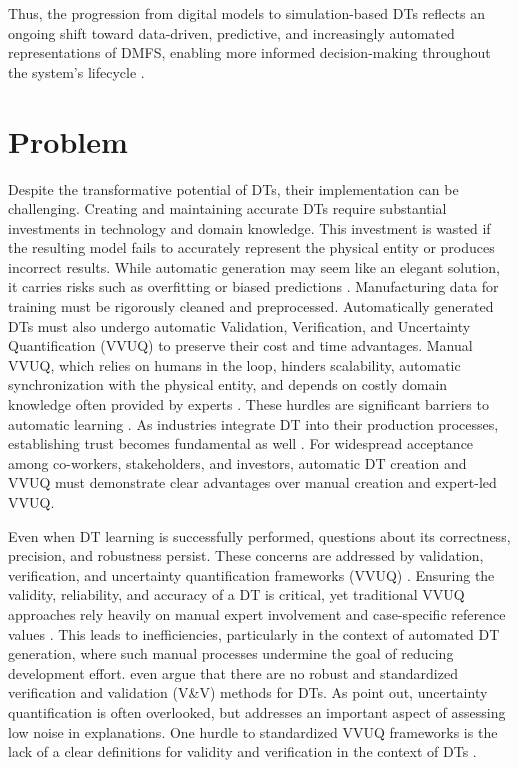 Thus, the progression from digital models to simulation-based DTs reflects an ongoing shift toward data-driven, predictive, and increasingly automated representations of DMFS, enabling more informed decision-making throughout the system's lifecycle \autocite{boschert2016digital,lim2020state}.

\section{Problem}
\label{sec:problem}
Despite the transformative potential of DTs, their implementation can be challenging. Creating and maintaining accurate DTs require substantial investments in technology and domain knowledge. This investment is wasted if the resulting model fails to accurately represent the physical entity or produces incorrect results. While automatic generation may seem like an elegant solution, it carries risks such as overfitting or biased predictions \autocite{gemanbias}. Manufacturing data for training must be rigorously cleaned and preprocessed. Automatically generated DTs must also undergo automatic Validation, Verification, and Uncertainty Quantification (VVUQ) to preserve their cost and time advantages. Manual VVUQ, which relies on humans in the loop, hinders scalability, automatic synchronization with the physical entity, and depends on costly domain knowledge often provided by experts \autocite{Bitencourt2023}. These hurdles are significant barriers to automatic learning \autocite{ribeiro2016should,zhao2024data}. As industries integrate DT into their production processes, establishing trust becomes fundamental as well \autocite{trauer2022digital,arrieta2020explainable}. For widespread acceptance among co-workers, stakeholders, and investors, automatic DT creation and VVUQ must demonstrate clear advantages over manual creation and expert-led VVUQ.

Even when DT learning is successfully performed, questions about its correctness, precision, and robustness persist. These concerns are addressed by validation, verification, and uncertainty quantification frameworks (VVUQ) \autocite{sel2025survey}. Ensuring the validity, reliability, and accuracy of a DT is critical, yet traditional VVUQ approaches rely heavily on manual expert involvement and case-specific reference values \autocite{Bitencourt2023,hua2022validation}. This leads to inefficiencies, particularly in the context of automated DT generation, where such manual processes undermine the goal of reducing development effort. \textcite{hua2022validation} even argue that there are no robust and standardized verification and validation (V\&V) methods for DTs. As \textcite{sel2025survey} point out, uncertainty quantification is often overlooked, but addresses an important aspect of assessing low noise in explanations. One hurdle to standardized VVUQ frameworks is the lack of a clear definitions for validity and verification in the context of DTs \autocite{Bitencourt2023}.

